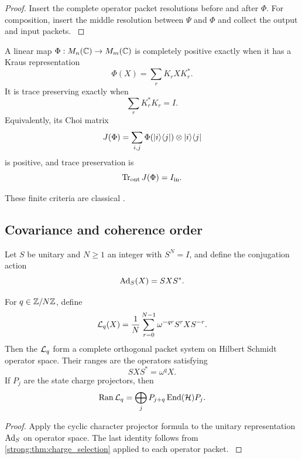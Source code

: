 \begin{proof}\label{strong:proof:032}
Insert the complete operator packet resolutions before and after \(\Phi\). For composition, insert the middle resolution between \(\Psi\) and \(\Phi\) and collect the output and input packets.
\label{strong:proof:032:end}\end{proof}

\begin{standardfact}\label{strong:standardfact:001}\label{strong:fact:kraus_choi}
A linear map \(\Phi:M_n(\CC)\to M_m(\CC)\) is completely positive exactly when it has a Kraus representation
\[
\Phi(X)=\sum_rK_rXK_r^*.
\]
It is trace preserving exactly when
\[
\sum_rK_r^*K_r=I.
\]
Equivalently, its Choi matrix
\[
J(\Phi)
=
\sum_{i,j}\Phi(\lvert i\rangle\langle j\rvert)\otimes\lvert i\rangle\langle j\rvert
\]
is positive, and trace preservation is
\[
\operatorname{Tr}_{\rm out}J(\Phi)=I_{\rm in}.
\]
\end{standardfact}

These finite criteria are classical \cite{Stinespring1955,Choi1975,Kraus1983,Watrous2018}.

\subsection{Covariance and coherence order}\label{strong:subsec:channel_covariance}

Let \(S\) be unitary and \(N\ge1\) an integer with \(S^N=I\), and define the conjugation action
\[
\operatorname{Ad}_S(X)=SXS^*.
\]

\begin{theorem}\label{strong:theorem:022}\label{strong:thm:coherence_projectors}
For \(q\in\ZZ/N\ZZ\), define
\[
\Lcal_q(X)
=
\frac1N
\sum_{r=0}^{N-1}
\omega^{-qr}S^rXS^{-r}.
\]
Then the \(\Lcal_q\) form a complete orthogonal packet system on Hilbert Schmidt operator space. Their ranges are the operators satisfying
\[
SXS^*=\omega^qX.
\]
If \(P_j\) are the state charge projectors, then
\[
\Ran\Lcal_q
=
\bigoplus_jP_{j+q}\End(\Hcal)P_j.
\]
\end{theorem}

\begin{proof}\label{strong:proof:033}
Apply the cyclic character projector formula to the unitary representation \(\operatorname{Ad}_S\) on operator space. The last identity follows from \cref{strong:thm:charge_selection} applied to each operator packet.
\label{strong:proof:033:end}\end{proof}

